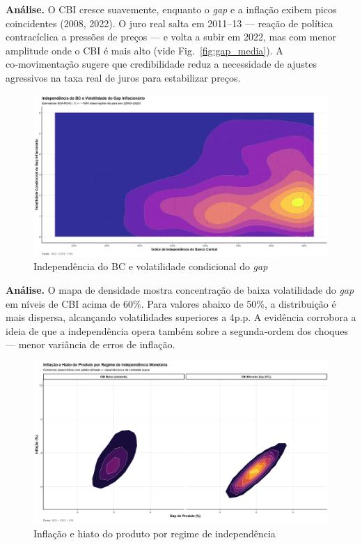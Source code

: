 \documentclass[a4paper,12pt]{article}[abnt2]
\begin{document}
\begin{flushleft}\small
\textbf{Análise.}
O CBI cresce suavemente, enquanto o \textit{gap} e a inflação exibem picos coincidentes (2008, 2022).  
O juro real salta em 2011–13 — reação de política contracíclica a pressões de preços — e volta a subir em 2022, mas com menor amplitude onde o CBI é mais alto (vide Fig.~\ref{fig:gap_media}).  
A co‑movimentação sugere que credibilidade reduz a necessidade de ajustes agressivos na taxa real de juros para estabilizar preços.
\end{flushleft}

\begin{figure}[H]
    \centering
    \caption{Independência do BC e volatilidade condicional do \textit{gap}}
    \label{fig:egarch}
    \includegraphics[width=.85\linewidth]{Imagens/an1i7.png}
\end{figure}

\begin{flushleft}\small
\textbf{Análise.}
O mapa de densidade mostra concentração de baixa volatilidade do \textit{gap} em níveis de CBI acima de 60\%.  
Para valores abaixo de 50\%, a distribuição é mais dispersa, alcançando volatilidades superiores a 4p.p.  
A evidência corrobora a ideia de que a independência opera também sobre a segunda‑ordem dos choques — menor variância de erros de inflação.
\end{flushleft}

\begin{figure}[H]
    \centering
    \caption{Inflação e hiato do produto por regime de independência}
    \label{fig:phillips_cbi}
    \includegraphics[width=.85\linewidth]{Imagens/an1i9.png}
\end{figure}
\end{document}
